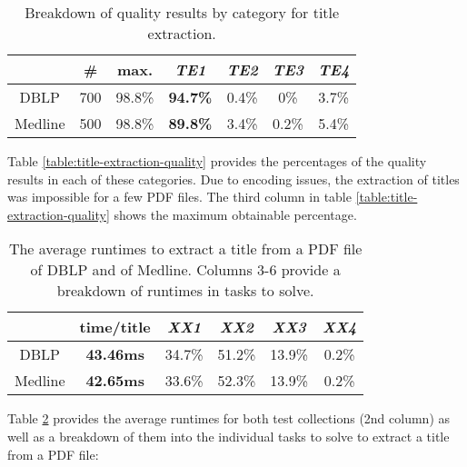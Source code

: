 \vspace{-1mm}
\begin{table}[ht]
\centering
{\renewcommand{\baselinestretch}{1.3}\normalsize
\hspace*{-2.5mm}
\begin{tabular}{|c|c|c||c|ccc|} \hline
& \# & max. & \textit{\textbf{TE1}} & \textit{TE2} & \textit{TE3} & \textit{TE4} \\ \hline
DBLP    & 700 & 98.8\% & \textbf{94.7\%} & 0.4\% & 0\%   & 3.7\% \\
Medline & 500 & 98.8\% & \textbf{89.8\%} & 3.4\% & 0.2\% & 5.4\% \\ \hline
\end{tabular}}
\vspace{-3mm}
\caption{Breakdown of quality results by category for title extraction.}
\label{table:title-extraction-quality2}
\vspace{-2mm}
\end{table}

Table \ref{table:title-extraction-quality} provides the percentages of the quality results in each of these categories. Due to encoding issues, the extraction of titles was impossible for a few PDF files. The third column in table \ref{table:title-extraction-quality} shows the maximum obtainable percentage.

\vspace{-1mm}
\begin{table}[ht]
\centering
{\renewcommand{\baselinestretch}{1.3}\normalsize
\hspace*{-2.5mm}
\begin{tabular}{|c|c|cccc|} \hline
& \textbf{time/title} &  \textit{XX1} & \textit{XX2} & \textit{XX3} & \textit{XX4} \\ \hline
DBLP    & \textbf{43.46ms} & 34.7\% & 51.2\% & 13.9\% & 0.2\% \\
Medline & \textbf{42.65ms} & 33.6\% & 52.3\% & 13.9\% & 0.2\% \\ \hline
\end{tabular}}
\vspace{-3mm}
\caption{The average runtimes to extract a title from a PDF file of DBLP and of Medline. Columns 3-6 provide a breakdown of runtimes in tasks to solve.}
\label{table:title-extraction-runtimes}
\vspace{-2mm}
\end{table}

Table \ref{table:title-extraction-runtimes} provides the average runtimes for both test collections (2nd column) as well as a breakdown of them into the individual tasks to solve to extract a title from a PDF file: 


